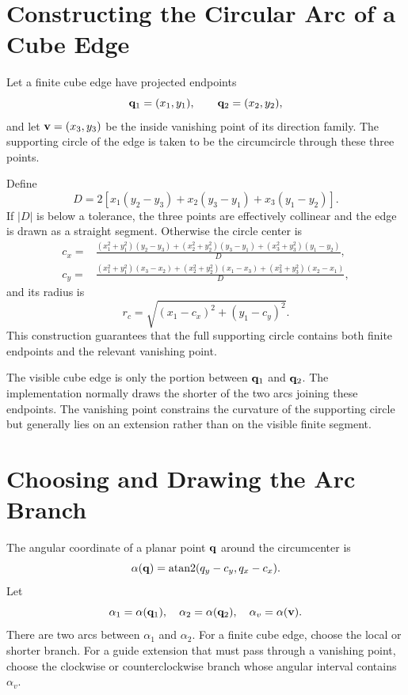 \section{Constructing the Circular Arc of a Cube Edge}
Let a finite cube edge have projected endpoints
\begin{equation}
  \vb q_1=(x_1,y_1),
  \qquad
  \vb q_2=(x_2,y_2),
\end{equation}
and let $\vb v=(x_3,y_3)$ be the inside vanishing point of its direction family.  The supporting circle of the edge is taken to be the circumcircle through these three points.

Define
\begin{equation}
  D=2\left[
  x_1(y_2-y_3)+x_2(y_3-y_1)+x_3(y_1-y_2)
  \right].
  \label{eq:circumcircle-determinant}
\end{equation}
If $|D|$ is below a tolerance, the three points are effectively collinear and the edge is drawn as a straight segment.  Otherwise the circle center is
\begin{align}
  c_x={}&\frac{
  (x_1^2+y_1^2)(y_2-y_3)
  +(x_2^2+y_2^2)(y_3-y_1)
  +(x_3^2+y_3^2)(y_1-y_2)}{D},\\
  c_y={}&\frac{
  (x_1^2+y_1^2)(x_3-x_2)
  +(x_2^2+y_2^2)(x_1-x_3)
  +(x_3^2+y_3^2)(x_2-x_1)}{D},
  \label{eq:circumcenter}
\end{align}
and its radius is
\begin{equation}
  r_c=\sqrt{(x_1-c_x)^2+(y_1-c_y)^2}.
  \label{eq:circumradius}
\end{equation}
This construction guarantees that the full supporting circle contains both finite endpoints and the relevant vanishing point.

The visible cube edge is only the portion between $\vb q_1$ and $\vb q_2$.  The implementation normally draws the shorter of the two arcs joining these endpoints.  The vanishing point constrains the curvature of the supporting circle but generally lies on an extension rather than on the visible finite segment.

\section{Choosing and Drawing the Arc Branch}
The angular coordinate of a planar point $\vb q$ around the circumcenter is
\begin{equation}
  \alpha(\vb q)=
  \operatorname{atan2}(q_y-c_y,q_x-c_x).
\end{equation}
Let
\begin{equation}
  \alpha_1=\alpha(\vb q_1),
  \quad
  \alpha_2=\alpha(\vb q_2),
  \quad
  \alpha_v=\alpha(\vb v).
\end{equation}
There are two arcs between $\alpha_1$ and $\alpha_2$.  For a finite cube edge, choose the local or shorter branch.  For a guide extension that must pass through a vanishing point, choose the clockwise or counterclockwise branch whose angular interval contains $\alpha_v$.

